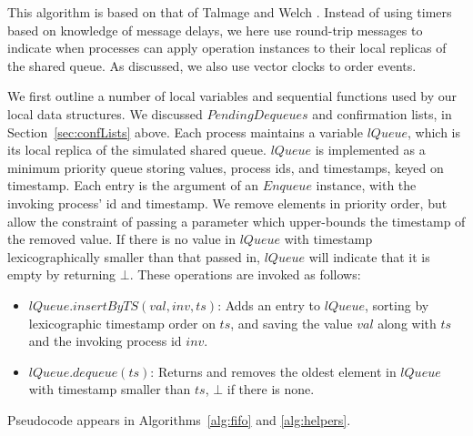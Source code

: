 \documentclass[a4paper,anonymous,USenglish]{lipics-v2021}
\theoremstyle{definition}
\begin{document}
This algorithm is based on that of Talmage and Welch \cite{TalmageWelch14}.  Instead of using timers based on knowledge of message delays, we here use round-trip messages to indicate when processes can apply operation instances to their local replicas of the shared queue.  As discussed, we also use vector clocks to order events.

We first outline a number of local variables and sequential functions used by our local data structures.  We discussed $PendingDequeues$ and confirmation lists, in Section~\ref{sec:confLists} above.  Each process maintains a variable $lQueue$, which is its local replica of the simulated shared queue.  $lQueue$ is implemented as a minimum priority queue storing values, process ids, and timestamps, keyed on timestamp.  Each entry is the argument of an $Enqueue$ instance, with the invoking process' id and timestamp.  We remove elements in priority order, but allow the constraint of passing a parameter which upper-bounds the timestamp of the removed value.  If there is no value in $lQueue$ with timestamp lexicographically smaller than that passed in, $lQueue$ will indicate that it is empty by returning $\bot$.  These operations are invoked as follows:
\begin{itemize}
\item $lQueue.insertByTS(val, inv, ts)$: Adds an entry to $lQueue$, sorting by lexicographic timestamp order on $ts$, and saving the value $val$ along with $ts$ and the invoking process id $inv$.
\item $lQueue.dequeue(ts)$: Returns and removes the oldest element in $lQueue$ with timestamp smaller than $ts$, $\bot$ if there is none.
\end{itemize}
Pseudocode appears in Algorithms~\ref{alg:fifo} and \ref{alg:helpers}.
\end{document}
